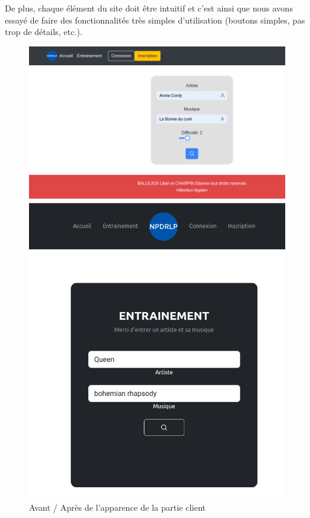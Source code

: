 \documentclass[12pt,french]{article}
\begin{document}
De plus, chaque élément du site doit être intuitif et c'est ainsi que nous avons essayé de faire des fonctionnalités très simples d'utilisation (boutons simples, pas trop de détails, etc.).

\begin{figure}[H]
	\centering
	\begin{minipage}{.5\textwidth}
		\centering
		\includegraphics[scale=0.25]{avantfront.png}
	\end{minipage}%
	\begin{minipage}{.5\textwidth}
		\centering
		\includegraphics[scale=0.25]{apresfront.png}
	\end{minipage}
	\caption{Avant / Après de l'apparence de la partie client}
	\label{figure8} 
\end{figure}
\end{document}
